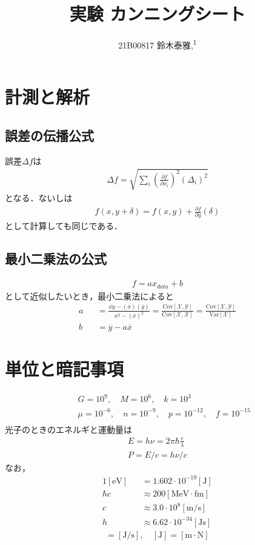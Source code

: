 \documentclass[12pt,dvipdfmx]{jsarticle}
\newcommand\authormark[1]{\textsuperscript{#1}}
\begin{document}
\title{実験 カンニングシート}

\author{21B00817 鈴木泰雅,\authormark{1}}
\section*{\Large{計測と解析}}

\subsection*{誤差の伝播公式}
誤差$\Delta f$は
\begin{eqnarray}
  \Delta f= \sqrt{ \sum_i \left(\frac{\partial f}{\partial x_i}\right)^2(\Delta_i)^2 }
\end{eqnarray}
となる．ないしは
\begin{eqnarray}
  f(x,y+\delta) = f(x,y) + \frac{\partial f}{\partial y}(\delta)
\end{eqnarray}
として計算しても同じである．
\subsection*{最小二乗法の公式}
\begin{eqnarray}
  f= ax_{data} + b
\end{eqnarray}
として近似したいとき，最小二乗法によると
\begin{eqnarray}
  a &&= \frac{\overline{xy} - (\overline{x})(\overline{y})}{\overline{x^2} - (\overline{x})^2} = \frac{\mathrm{Cov}[\mathcal{X},\mathcal{Y}]}{\mathrm{Cov}[\mathcal{X}, \mathcal{X}]} = \frac{\mathrm{Cov}[\mathcal{X},\mathcal{Y}]}{\mathrm{Var}[\mathcal{X}]}\\
  b &&= \overline{y} - a\overline{x}
\end{eqnarray}
\section*{\Large{単位と暗記事項}}
\begin{eqnarray}
  &&G= 10^{9},\quad M=10^{6},\quad k = 10^{3} \\
  &&\mu= 10^{-6},\quad n=10^{-9},\quad p = 10^{-12},\quad f = 10^{-15} \\ 
\end{eqnarray}
光子のときのエネルギと運動量は
\begin{eqnarray}
  E = h\nu = 2\pi\hbar\frac{c}{\lambda}\\
  P = E/c = h\nu/c
\end{eqnarray}
なお，
\begin{eqnarray}
  1[\text{eV}] &&= 1.602\cdot 10^{-19}[\text{J}]\\
  \hbar c &&\approx 200[\text{MeV}\cdot\text{fm}]\\
   c &&\approx 3.0\cdot 10^{8}[\text{m}/\text{s}]\\
   h &&\approx 6.62\cdot 10^{-34}[\text{Js}]
\end{eqnarray}
\begin{eqnarray}
  [\text{W}]= [\text{J}/\text{s}],\quad [\text{J}]= [\text{m}\cdot\text{N}]
\end{eqnarray}
\end{document}
